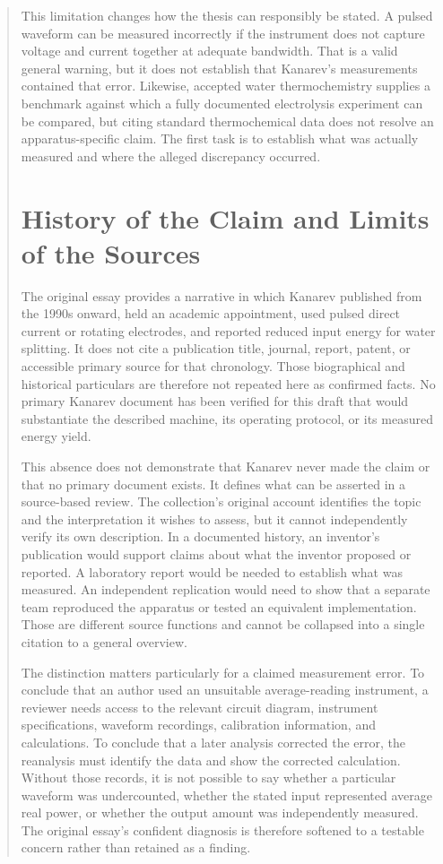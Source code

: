 \documentclass[11pt]{article}
\begin{document}
\begin{abstract}
This limitation changes how the thesis can responsibly be stated. A pulsed waveform can be measured incorrectly if the instrument does not capture voltage and current together at adequate bandwidth. That is a valid general warning, but it does not establish that Kanarev's measurements contained that error. Likewise, accepted water thermochemistry supplies a benchmark against which a fully documented electrolysis experiment can be compared, but citing standard thermochemical data does not resolve an apparatus-specific claim. The first task is to establish what was actually measured and where the alleged discrepancy occurred.

\section{History of the Claim and Limits of the Sources}

The original essay provides a narrative in which Kanarev published from the 1990s onward, held an academic appointment, used pulsed direct current or rotating electrodes, and reported reduced input energy for water splitting. It does not cite a publication title, journal, report, patent, or accessible primary source for that chronology. Those biographical and historical particulars are therefore not repeated here as confirmed facts. No primary Kanarev document has been verified for this draft that would substantiate the described machine, its operating protocol, or its measured energy yield.

This absence does not demonstrate that Kanarev never made the claim or that no primary document exists. It defines what can be asserted in a source-based review. The collection's original account identifies the topic and the interpretation it wishes to assess, but it cannot independently verify its own description. In a documented history, an inventor's publication would support claims about what the inventor proposed or reported. A laboratory report would be needed to establish what was measured. An independent replication would need to show that a separate team reproduced the apparatus or tested an equivalent implementation. Those are different source functions and cannot be collapsed into a single citation to a general overview.

The distinction matters particularly for a claimed measurement error. To conclude that an author used an unsuitable average-reading instrument, a reviewer needs access to the relevant circuit diagram, instrument specifications, waveform recordings, calibration information, and calculations. To conclude that a later analysis corrected the error, the reanalysis must identify the data and show the corrected calculation. Without those records, it is not possible to say whether a particular waveform was undercounted, whether the stated input represented average real power, or whether the output amount was independently measured. The original essay's confident diagnosis is therefore softened to a testable concern rather than retained as a finding.


\end{abstract}
\end{document}

